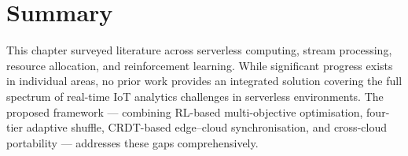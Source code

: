 \section{Summary}
This chapter surveyed literature across serverless computing, stream processing,
resource allocation, and reinforcement learning. While significant progress exists in
individual areas, no prior work provides an integrated solution covering the full
spectrum of real-time IoT analytics challenges in serverless environments. The proposed
framework — combining RL-based multi-objective optimisation, four-tier adaptive shuffle,
CRDT-based edge--cloud synchronisation, and cross-cloud portability — addresses these
gaps comprehensively.
